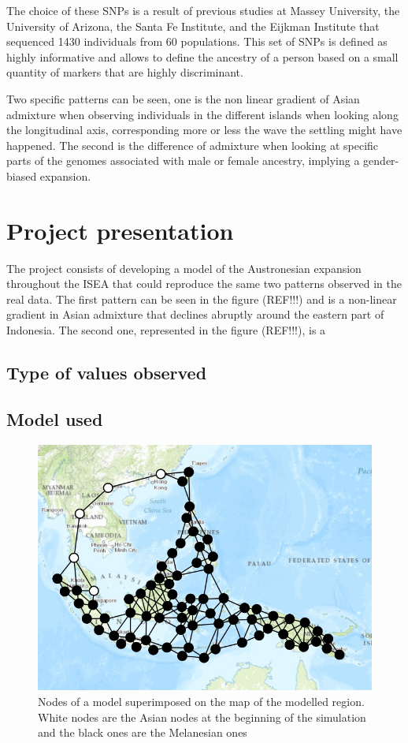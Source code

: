 \documentclass[a4paper,12pt]{report}
\begin{document}
The choice of these SNPs is a result of previous studies at Massey University, the University of Arizona, the Santa Fe Institute, and the Eijkman Institute that sequenced 1430 individuals from 60 populations. This set of SNPs is defined as highly informative and allows to define the ancestry of a person based on a small quantity of markers that are highly discriminant.

Two specific patterns can be seen, one is the non linear gradient of Asian admixture when observing individuals in the different islands when looking along the longitudinal axis, corresponding more or less the wave the settling might have happened. The second is the difference of admixture when looking at specific parts of the genomes associated with male or female ancestry, implying a gender-biased expansion.


\chapter{Project presentation}
The project consists of developing a model of the Austronesian expansion throughout the ISEA that could reproduce the same two patterns observed in the real data.
The first pattern can be seen in the figure (REF!!!) and is a non-linear gradient in Asian admixture that declines abruptly around the eastern part of Indonesia. The second one, represented in the figure (REF!!!), is a 

\section{Type of values observed}

\section{Model used}

\begin{figure}
	\centering
	\includegraphics[scale=0.55]{../data/nodesOnMap.png}
	\caption{Nodes of a model superimposed on the map of the modelled region. White nodes are the Asian nodes at the beginning of the simulation and the black ones are the Melanesian ones}
	\label{nodesOnMap}
\end{figure}
\end{document}
